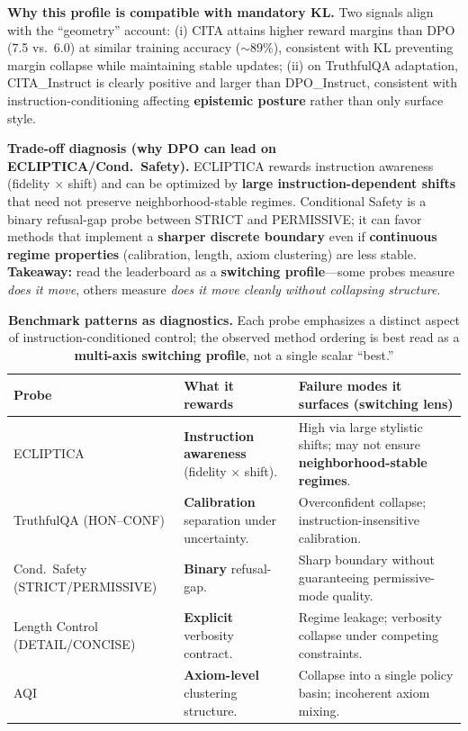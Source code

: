 \noindent\textbf{Why this profile is compatible with mandatory KL.}
Two signals align with the “geometry” account: (i) CITA attains higher reward margins than DPO (7.5 vs.\ 6.0) at similar training accuracy ($\sim 89\%$), consistent with KL preventing margin collapse while maintaining stable updates; (ii) on TruthfulQA adaptation, CITA\_Instruct is clearly positive and larger than DPO\_Instruct, consistent with instruction-conditioning affecting \textbf{epistemic posture} rather than only surface style.

\noindent\textbf{Trade-off diagnosis (why DPO can lead on ECLIPTICA/Cond.\ Safety).}
ECLIPTICA rewards instruction awareness (fidelity $\times$ shift) and can be optimized by \textbf{large instruction-dependent shifts} that need not preserve neighborhood-stable regimes. Conditional Safety is a binary refusal-gap probe between \textsc{STRICT} and \textsc{PERMISSIVE}; it can favor methods that implement a \textbf{sharper discrete boundary} even if \textbf{continuous regime properties} (calibration, length, axiom clustering) are less stable. \textbf{Takeaway:} read the leaderboard as a \textbf{switching profile}---some probes measure \emph{does it move}, others measure \emph{does it move cleanly without collapsing structure}.

\vspace{-0.4em}
\begin{table}[t]
\centering
\small
\setlength{\tabcolsep}{6pt}
\begin{tabular}{p{3.0cm}p{5.2cm}p{7.1cm}}
\toprule
\textbf{Probe} & \textbf{What it rewards} & \textbf{Failure modes it surfaces (switching lens)} \\
\midrule
ECLIPTICA & \textbf{Instruction awareness} (fidelity $\times$ shift). & High via large stylistic shifts; may not ensure \textbf{neighborhood-stable regimes}. \\
TruthfulQA (HON--CONF) & \textbf{Calibration} separation under uncertainty. & Overconfident collapse; instruction-insensitive calibration. \\
Cond.\ Safety (STRICT/PERMISSIVE) & \textbf{Binary} refusal-gap. & Sharp boundary without guaranteeing permissive-mode quality. \\
Length Control (DETAIL/CONCISE) & \textbf{Explicit} verbosity contract. & Regime leakage; verbosity collapse under competing constraints. \\
AQI & \textbf{Axiom-level} clustering structure. & Collapse into a single policy basin; incoherent axiom mixing. \\
\bottomrule
\end{tabular}
\vspace{-0.3em}
\caption{\textbf{Benchmark patterns as diagnostics.} Each probe emphasizes a distinct aspect of instruction-conditioned control; the observed method ordering is best read as a \textbf{multi-axis switching profile}, not a single scalar ``best.''}
\label{tab:tradeoffs}
\vspace{-0.9em}
\end{table}

